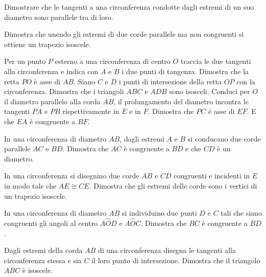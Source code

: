 \begin{multicols}{2}
\begin{esercizio}
\label{ese:5.24}
Dimostrare che le tangenti a una circonferenza condotte dagli estremi 
di un suo diametro sono parallele tra di loro.
\end{esercizio}


\begin{esercizio}
\label{ese:5.30}
Dimostra che unendo gli estremi di due corde parallele ma non 
congruenti si ottiene un trapezio isoscele.
\end{esercizio}


\begin{esercizio}
\label{ese:5.33}
Per un punto $P$ esterno a una circonferenza di centro $O$ traccia le 
due tangenti alla circonferenza e indica con $A$ e $B$ i due punti di 
tangenza. Dimostra che la retta $PO$ è asse di $AB$. Siano $C$ e $D$ 
i punti di intersezione della retta $OP$ con la circonferenza. 
Dimostra che i triangoli $ABC$ e $ADB$ sono isosceli. Conduci per $O$ 
il diametro parallelo alla corda $AB$, il prolungamento del diametro 
incontra le tangenti $PA$ e $PB$ rispettivamente in $E$ e in $F$. 
Dimostra che $PC$ è asse di $EF$. E che $EA$ è congruente a $BF$.
\end{esercizio}

\begin{esercizio}
\label{ese:5.34}
In una circonferenza di diametro $AB$, dagli estremi $A$ e $B$ si 
conducano due corde parallele $AC$ e $BD$. Dimostra che $AC$ è 
congruente a $BD$ e che $CD$ è un diametro.
\end{esercizio}

\begin{esercizio}
\label{ese:5.35}
In una circonferenza si disegnino due corde $AB$ e $CD$ congruenti e 
incidenti in $E$ in modo tale che $AE\cong CE$. Dimostra che gli 
estremi delle corde sono i vertici di un trapezio isoscele.
\end{esercizio}

\begin{esercizio}
\label{ese:5.36}
In una circonferenza di diametro $AB$ si individuino due punti $D$ e 
$C$ tali che siano congruenti gli angoli al centro $A\widehat{O}D$ e 
$A\widehat{O}C$. Dimostra che $BC$ è congruente a $BD$.
\end{esercizio}

\begin{esercizio}
\label{ese:5.37}
Dagli estremi della corda $AB$ di una circonferenza disegna le 
tangenti alla circonferenza stessa e sia $C$ il loro punto di 
intersezione. Dimostra che il triangolo $ABC$ è isoscele.
\end{esercizio}



\end{multicols}
